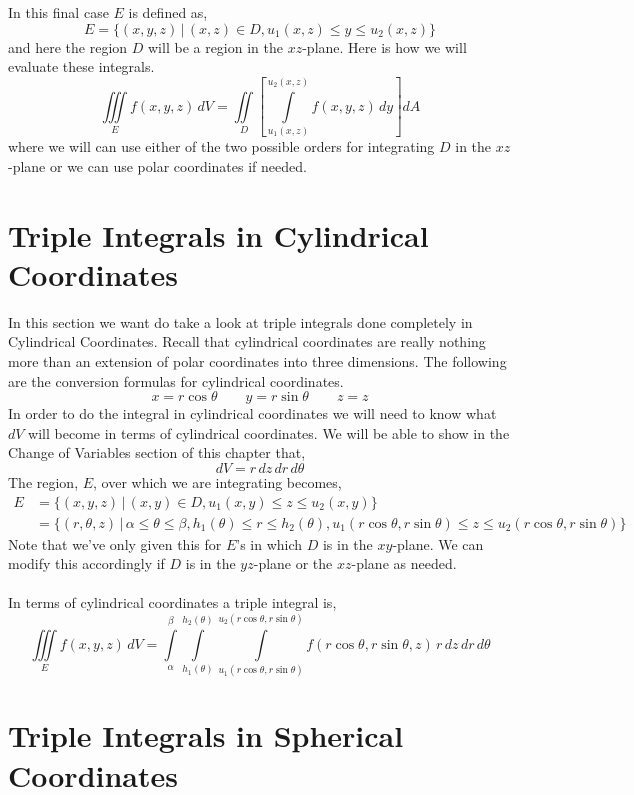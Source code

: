 \documentclass[10pt,reqno]{book}
\theoremstyle{definition}
\begin{document}
	In this final case $ E $ is defined as,
	\[ E = \{ (x,y,z) \, \lvert \, (x,z) \in D, u_1(x,z) \leq y \leq u_2(x,z) \} \]
	and here the region $ D $ will be a region in the $ xz $-plane. Here is how we will evaluate these integrals.
	\[ \iiint\limits_E f(x,y,z)\,dV = \iint\limits_D \left[ \int\limits_{u_1(x,z)}^{u_2(x,z)} f(x,y,z)\,dy \right]dA \]
	where we will can use either of the two possible orders for integrating $ D $ in the $ xz $-plane or we can use polar coordinates if needed.

	\section{Triple Integrals in Cylindrical Coordinates}

	In this section we want do take a look at triple integrals done completely in Cylindrical Coordinates. Recall that cylindrical coordinates are really nothing more than an extension of polar coordinates into three dimensions. The following are the conversion formulas for cylindrical coordinates.
	\[ x = r\cos\theta \qquad y = r\sin\theta \qquad z = z \]
	In order to do the integral in cylindrical coordinates we will need to know what $ dV $ will become in terms of cylindrical coordinates. We will be able to show in the Change of Variables section of this chapter that,
	\[ dV = r\,dz\,dr\,d\theta \]
	The region, $ E $, over which we are integrating becomes,
	\begin{align*}
		E &= \{ (x,y,z) \, \lvert \, (x,y) \in D, u_1(x,y) \leq z \leq u_2(x,y) \}\\
		  &= \{ (r,\theta,z) \, \lvert \, \alpha \leq \theta \leq \beta, h_1(\theta) \leq r \leq h_2(\theta), u_1(r\cos\theta,r\sin\theta) \leq z \leq u_2(r\cos\theta,r\sin\theta) \}
	\end{align*}
	Note that we've only given this for $ E $'s in which $ D $ is in the $ xy $-plane. We can modify this accordingly if $ D $ is in the $ yz $-plane or the $ xz $-plane as needed.\\ \\
	In terms of cylindrical coordinates a triple integral is,
	\[ \iiint\limits_E f(x,y,z)\,dV = \int\limits_{\alpha}^{\beta} \int\limits_{h_1(\theta)}^{h_2(\theta)} \int\limits_{u_1(r\cos\theta,r\sin\theta)}^{u_2(r\cos\theta,r\sin\theta)} f(r\cos\theta,r\sin\theta,z)\,r\,dz\,dr\,d\theta \]
	
	\section{Triple Integrals in Spherical Coordinates}
\end{document}
